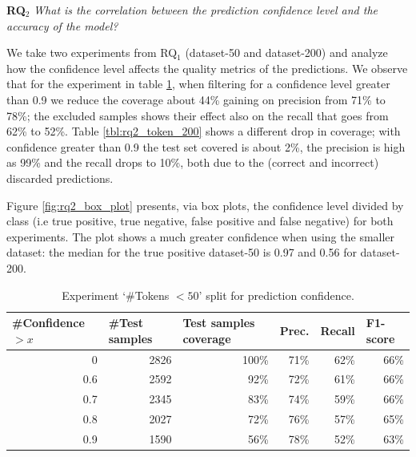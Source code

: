\textbf{RQ$_2$} \textit{What is the correlation between the prediction confidence level and the accuracy of the model?}

We take two experiments from RQ$_1$ (dataset-50 and dataset-200) and analyze how the confidence level affects the quality metrics of the predictions. We observe that for the experiment in table \ref{tbl:rq2_token_50}, when filtering for a confidence level greater than 0.9 we reduce the coverage about 44\% gaining on precision from 71\% to 78\%; the excluded samples shows their effect also on the recall that goes from 62\% to 52\%. 
Table \ref{tbl:rq2_token_200} shows a different drop in coverage; with confidence greater than 0.9 the test set covered is about 2\%, the precision is high as 99\% and the recall drops to 10\%, both due to the (correct and incorrect) discarded predictions.
 
Figure \ref{fig:rq2_box_plot} presents, via box plots, the confidence level divided by class (i.e true positive, true negative, false positive and false negative) for both experiments. The plot shows a much greater confidence when using the smaller dataset: the median for the true positive dataset-50 is 0.97 and 0.56 for dataset-200.

\begin{table}[h!]
\centering
\caption{Experiment `\#Tokens $< 50$' split for prediction confidence.\label{tbl:rq2_token_50}}

\begin{tabular}{|r|r|r|r|r|r|}
\hline
  \multicolumn{1}{|l|}{\#Confidence $> x$} &
  \multicolumn{1}{l|}{\#Test samples} &
  \multicolumn{1}{l|}{Test samples coverage} &
  \multicolumn{1}{l|}{Prec.} &
  \multicolumn{1}{l|}{Recall} &
  \multicolumn{1}{l|}{F1-score} \\ 
\hline
0   & 2826 & 100\% & 71\% & 62\% & 66\% \\
0.6 & 2592 & 92\%  & 72\% & 61\% & 66\% \\
0.7 & 2345 & 83\%  & 74\% & 59\% & 66\% \\
0.8 & 2027 & 72\%  & 76\% & 57\% & 65\% \\
0.9 & 1590 & 56\%  & 78\% & 52\% & 63\% \\
\hline
\end{tabular}
\end{table}

